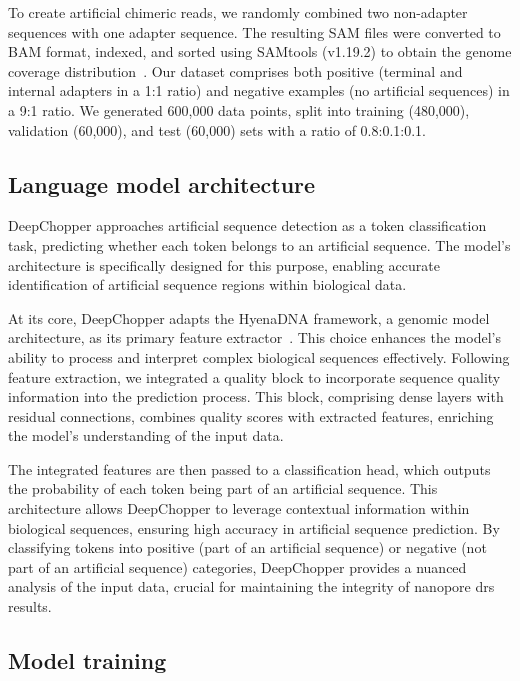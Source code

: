 \documentclass[pdflatex, sn-mathphys-num, lineno]{sn-jnl}%
\theoremstyle{thmstyleone}%
\theoremstyle{thmstyletwo}%
\theoremstyle{thmstylethree}%
\begin{document}
To create artificial chimeric reads, we randomly combined two non-adapter sequences with one adapter sequence.
The resulting SAM files were converted to BAM format, indexed, and sorted using SAMtools (v1.19.2) to obtain the genome coverage distribution~\cite{li2009sequence}.
Our dataset comprises both positive (terminal and internal adapters in a 1:1 ratio) and negative examples (no artificial sequences) in a 9:1 ratio.
We generated 600,000 data points, split into training (480,000), validation (60,000), and test (60,000) sets with a ratio of 0.8:0.1:0.1.


\subsection{Language model architecture}\label{ssec:lm}

DeepChopper approaches artificial sequence detection as a token classification task, predicting whether each token belongs to an artificial sequence.
The model's architecture is specifically designed for this purpose, enabling accurate identification of artificial sequence regions within biological data.

At its core, DeepChopper adapts the HyenaDNA framework, a genomic model architecture, as its primary feature extractor~\cite{nguyen2024hyenadna}.
This choice enhances the model's ability to process and interpret complex biological sequences effectively.
Following feature extraction, we integrated a quality block to incorporate sequence quality information into the prediction process.
This block, comprising dense layers with residual connections, combines quality scores with extracted features, enriching the model's understanding of the input data.

The integrated features are then passed to a classification head, which outputs the probability of each token being part of an artificial sequence.
This architecture allows DeepChopper to leverage contextual information within biological sequences, ensuring high accuracy in artificial sequence prediction.
By classifying tokens into positive (part of an artificial sequence) or negative (not part of an artificial sequence) categories, DeepChopper provides a nuanced analysis of the input data, crucial for maintaining the integrity of nanopore \gls{drs}  results.



\subsection{Model training}\label{ssec:training}
\end{document}
